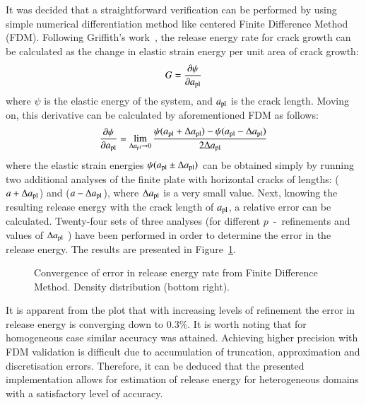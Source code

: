 \documentclass[11pt]{acmeArticle}
\numberwithin{equation}{section}
\begin{document}
It was decided that a straightforward verification can be performed by using simple numerical differentiation method like centered Finite Difference Method (FDM). Following Griffith's work~\citep{Griffith163}, the release energy rate for crack growth can be calculated as the change in elastic strain energy per unit area of crack growth:
\begin{equation}
G = \frac{\partial \psi}{\partial a_{\rm {pl}}}
\end{equation}
where $\psi$ is the elastic energy of the system, and $a_{\rm{pl}}$ is the crack length. Moving on, this derivative can be calculated by aforementioned FDM as follows:
\begin{equation}
 \frac{\partial \psi}{\partial a_{\rm {pl}}} = \lim_{\Delta a_{\rm {pl}} \to 0} \frac{\psi(a_{\rm {pl}} + \Delta a_{\rm {pl}}) - \psi(a_{\rm {pl}} -\Delta a_{\rm {pl}})}{2\Delta a_{\rm {pl}}}
\end{equation}
where the elastic strain energies $\psi(a_{\rm {pl}} \pm \Delta a_{\rm {pl}})$ can be obtained simply by running two additional analyses of the finite plate with horizontal cracks of lengths: ($a + \Delta a_{\rm {pl}}$) and ($a - \Delta a_{\rm {pl}}$), where $\Delta a_{\rm {pl}}$ is a very small value. 
Next, knowing the resulting release energy with the crack length of $a_{\rm {pl}}$, a relative error can be calculated. 
Twenty-four sets of three analyses (for different $p$~-~refinements and values of $\Delta a_{\rm {pl}}$ ) have been performed in order to determine the error in the release energy. 
The results are presented in Figure~\ref{fig:covergencefdm}.
\begin{figure}
	\centering
	\caption{Convergence of error in release energy rate from Finite Difference Method. Density distribution (bottom right).}
	\label{fig:covergencefdm}
\end{figure}
It is apparent from the plot that with increasing levels of refinement the error in release energy is converging down to 0.3\%. It is worth noting that for homogeneous case similar accuracy was attained.  Achieving higher precision with FDM validation is difficult due to accumulation of truncation, approximation and discretisation errors.
Therefore, it can be deduced that the presented implementation allows for estimation of release energy for heterogeneous domains with a satisfactory level of accuracy.
\end{document}
